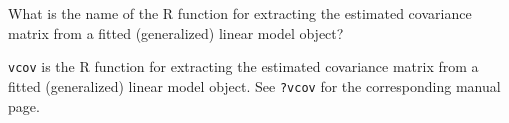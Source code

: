 
\begin{question}
What is the name of the R function for
extracting the estimated covariance matrix from a fitted (generalized) linear model object?
\end{question}

\begin{solution}
\texttt{vcov} is the R function for
extracting the estimated covariance matrix from a fitted (generalized) linear model object.
See \texttt{?vcov} for the corresponding manual page.
\end{solution}

